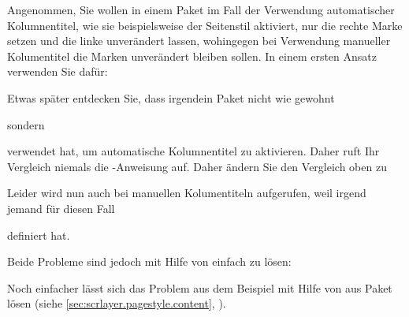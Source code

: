 \begin{Example}
  Angenommen, Sie wollen in einem Paket im Fall der Verwendung automatischer
  Kolumnentitel, wie sie beispielsweise der Seitenstil
   aktiviert, nur die rechte
  Marke setzen und die linke unverändert lassen, wohingegen bei Verwendung
  manueller Kolumentitel die Marken unverändert bleiben sollen. In einem
  ersten Ansatz verwenden Sie dafür:
\begin{lstcode}
  \ifx\@mkboth\markboth {}\fi
\end{lstcode}
  Etwas später entdecken Sie, dass irgendein Paket nicht wie gewohnt
\begin{lstcode}
  \let\@mkboth\markboth
\end{lstcode}
  sondern
\begin{lstcode}
  \renewcommand{\@mkboth}{\markboth}
\end{lstcode}
  verwendet hat, um automatische Kolumnentitel zu aktivieren. Daher ruft Ihr
  Vergleich niemals die -Anweisung auf.  Daher
  ändern Sie den Vergleich oben zu
\begin{lstcode}
  \ifx\@mkboth\@gobbletwo
  \else {}\fi
\end{lstcode}
  Leider wird nun  auch bei manuellen
  Kolumentiteln aufgerufen, weil irgend jemand für diesen Fall
\begin{lstcode}
  \renewcommand{\@mkboth}[2]{%
    \typeout{DEBUG: ignoring running head setting}%
  }
\end{lstcode}
  definiert hat.

  Beide Probleme sind jedoch mit Hilfe von  einfach zu lösen:
\begin{lstcode}
\end{lstcode}%
\end{Example}
Noch einfacher lässt sich das Problem aus dem Beispiel %
\iffalse übrigens \fi %
mit Hilfe von  aus Paket
\hyperref[cha:scrlayer]{} lösen (siehe
\autoref{sec:scrlayer.pagestyle.content},
).%
\EndIndexGroup


